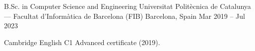 

\begin{cventries}

  \cventry
    {B.Sc. in Computer Science and Engineering}
    {Universitat Politècnica de Catalunya --- Facultat d'Informàtica de Barcelona (FIB)}
    {Barcelona, Spain}
    {Mar 2019 -- Jul 2023}
    {
      \begin{cvitems}
        \item {Cambridge English C1 Advanced certificate (2019).}
      \end{cvitems}
    }
\end{cventries}
